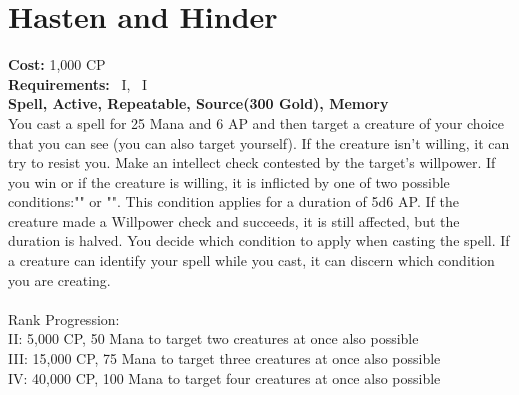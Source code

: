 \section{Hasten and Hinder}\label{spell:hastenHinder}
\textbf{Cost:} 1,000 CP\\
\textbf{Requirements:}~ I,~ I\\
\textbf{Spell, Active, Repeatable, Source(300 Gold), Memory}\\
You cast a spell for 25 Mana and 6 AP and then target a creature of your choice that you can see (you can also target yourself).
If the creature isn't willing, it can try to resist you.
Make an intellect check contested by the target's willpower.
If you win or if the creature is willing, it is inflicted by one of two possible conditions:"" or "".
This condition applies for a duration of 5d6 AP.
If the creature made a Willpower check and succeeds, it is still affected, but the duration is halved.
You decide which condition to apply when casting the spell.
If a creature can identify your spell while you cast, it can discern which condition you are creating.\\
\\
Rank Progression:\\
II: 5,000 CP, 50 Mana to target two creatures at once also possible\\
III: 15,000 CP, 75 Mana to target three creatures at once also possible\\
IV: 40,000 CP, 100 Mana to target four creatures at once also possible \\